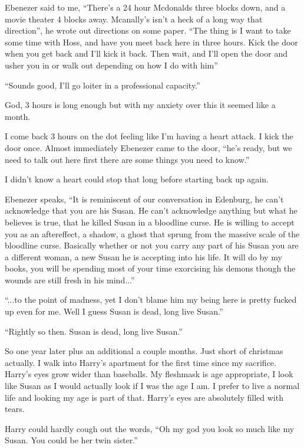 Ebenezer said to me, ``There's a 24 hour Mcdonalds three blocks down, and a movie theater 4 blocks away. Mcanally's isn't a heck of a long way that direction'', he wrote out directions on some paper. ``The thing is I want to take some time with Hoss, and have you meet back here in three hours. Kick the door when you get back and I'll kick it back. Then wait, and I'll open the door and usher you in or walk out depending on how I do with him''

``Sounds good, I'll go loiter in a professional capacity.''

God, 3 hours is long enough but with my anxiety over this it seemed like a month.

I come back 3 hours on the dot feeling like I'm having a heart attack. I kick the door once. Almost immediately Ebenezer came to the door, ``he's ready, but we need to talk out here first there are some things you need to know.''

I didn't know a heart could stop that long before starting back up again.

Ebenezer speaks, ``It is reminiscent of our conversation in Edenburg, he can't acknowledge that you are his Susan. He can't acknowledge anything but what he believes is true, that he killed Susan in a bloodline curse. He is willing to accept you as an aftereffect, a shadow, a ghost that sprung from the massive scale of the bloodline curse. Basically whether or not you carry any part of his Susan you are a different woman, a new Susan he is accepting into his life. It will do by my books, you will be spending most of your time exorcising his demons though the wounds are still fresh in his mind...''

``...to the point of madness, yet I don't blame him my being here is pretty fucked up even for me. Well I guess Susan is dead, long live Susan.''

``Rightly so then. Susan is dead, long live Susan.''

So one year later plus an additional a couple months. Just short of christmas actually. I walk into Harry's apartment for the first time since my sacrifice. Harry's eyes grow wider than baseballs. My fleshmask is age appropriate, I look like Susan as I would actually look if I was the age I am. I prefer to live a normal life and looking my age is part of that. Harry's eyes are absolutely filled with tears.

Harry could hardly cough out the words, ``Oh my god you look so much like my Susan. You could be her twin sister.''

